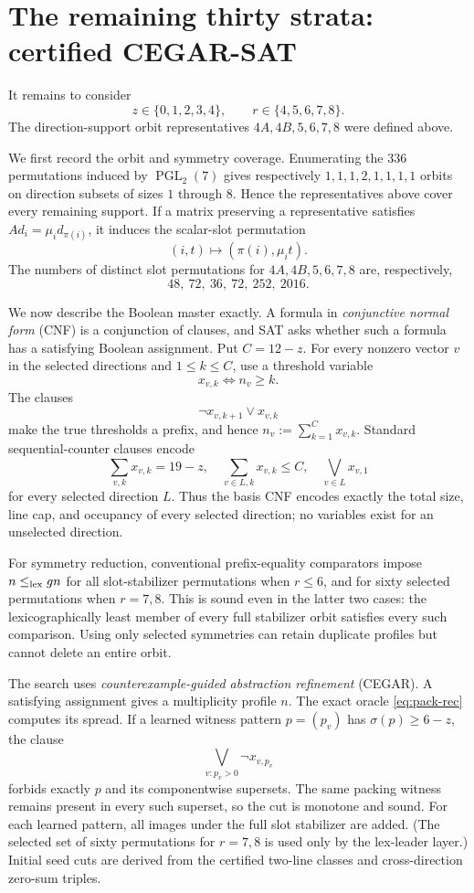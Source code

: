 \documentclass[11pt]{amsart}
\theoremstyle{definition}
\begin{document}
\section{The remaining thirty strata: certified CEGAR-SAT}\label{sec:cegar}

It remains to consider
\[
z\in\{0,1,2,3,4\},\qquad r\in\{4,5,6,7,8\}.
\]
The direction-support orbit representatives $4A,4B,5,6,7,8$ were
defined above.

We first record the orbit and symmetry coverage.  Enumerating the $336$
permutations induced by $\operatorname{PGL}_2(7)$ gives respectively
$1,1,1,2,1,1,1,1$ orbits on direction subsets of sizes $1$ through
$8$.  Hence the representatives above cover every remaining support.
If a matrix preserving a representative satisfies
$A d_i=\mu_i d_{\pi(i)}$, it induces the scalar-slot permutation
\[
(i,t)\longmapsto(\pi(i),\mu_i t).
\]
The numbers of distinct slot permutations for
$4A,4B,5,6,7,8$ are, respectively,
\[
48,\ 72,\ 36,\ 72,\ 252,\ 2016.
\]

We now describe the Boolean master exactly.  A formula in
\emph{conjunctive normal form} (CNF) is a conjunction of clauses, and
SAT asks whether such a formula has a satisfying Boolean assignment.
Put $C=12-z$.  For every nonzero vector $v$ in the selected directions
and $1\leq k\leq C$, use a threshold variable
\[
x_{v,k}\Longleftrightarrow n_v\geq k.
\]
The clauses
\[
\neg x_{v,k+1}\vee x_{v,k}
\]
make the true thresholds a prefix, and hence
$n_v:=\sum_{k=1}^C x_{v,k}$.  Standard sequential-counter clauses
encode
\[
\sum_{v,k}x_{v,k}=19-z,
\quad
\sum_{v\in L,k}x_{v,k}\leq C,
\quad
\bigvee_{v\in L}x_{v,1}
\]
for every selected direction $L$.  Thus the basis CNF encodes exactly
the total size, line cap, and occupancy of every selected direction;
no variables exist for an unselected direction.

For symmetry reduction, conventional prefix-equality comparators impose
$n\leq_{\rm lex}gn$ for all slot-stabilizer permutations when
$r\leq6$, and for sixty selected permutations when $r=7,8$.  This is
sound even in the latter two cases: the lexicographically least member
of every full stabilizer orbit satisfies every such comparison.  Using
only selected symmetries can retain duplicate profiles but cannot delete
an entire orbit.

The search uses \emph{counterexample-guided abstraction refinement}
(CEGAR).  A satisfying assignment gives a multiplicity profile $n$.
The exact oracle \eqref{eq:pack-rec} computes its spread.  If a
learned witness pattern $p=(p_v)$ has
$\sigma(p)\geq6-z$, the clause
\begin{equation}\label{eq:cut}
\bigvee_{v:p_v>0}\neg x_{v,p_v}
\end{equation}
forbids exactly $p$ and its componentwise supersets.  The same packing
witness remains present in every such superset, so the cut is monotone
and sound.  For each learned pattern, all images under the full slot
stabilizer are added.  (The selected set of sixty permutations for
$r=7,8$ is used only by the lex-leader layer.)  Initial seed cuts are
derived from the certified two-line classes and cross-direction
zero-sum triples.
\end{document}
